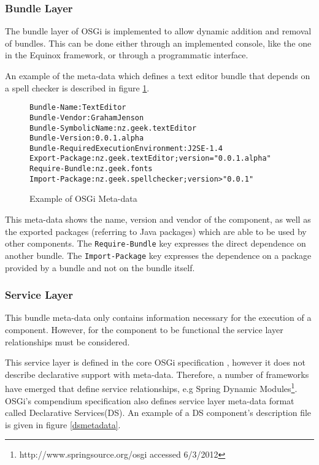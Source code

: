 \subsubsection{Bundle Layer}
The bundle layer of OSGi is implemented to allow dynamic addition and removal of bundles.
This can be done either through an implemented console, like the one in the Equinox framework, or through a programmatic interface.

An example of the meta-data which defines a text editor bundle that depends on a spell checker is described in figure \ref{osgibundle}.

\begin{figure}[htp]
\begin{center}
\begin{alltt}
Bundle-Name: TextEditor
Bundle-Vendor: Graham Jenson
Bundle-SymbolicName: nz.geek.textEditor
Bundle-Version: 0.0.1.alpha
Bundle-RequiredExecutionEnvironment: J2SE-1.4
Export-Package: nz.geek.textEditor;version="0.0.1.alpha"
Require-Bundle: nz.geek.fonts
Import-Package: nz.geek.spellchecker;version>"0.0.1"
\end{alltt}
  \caption[OSGi Meta-data]{Example of OSGi Meta-data}
  \label{osgibundle}
\end{center}
\end{figure}

This meta-data shows the name, version and vendor of the component, as well as the exported packages (referring to Java packages) which are able to be used by other components.
The \texttt{Require-Bundle} key expresses the direct dependence on another bundle.
The \texttt{Import-Package} key expresses the dependence on a package provided by a bundle and not on the bundle itself.

\subsubsection{Service Layer}
This bundle meta-data only contains information necessary for the execution of a component.
However, for the component to be functional the service layer relationships must be considered.

This service layer is defined in the core OSGi specification \citep{osgicore2007}, however it does not describe declarative support with meta-data.
Therefore, a number of frameworks have emerged that define service relationships, e.g
Spring Dynamic Modules\footnote{http://www.springsource.org/osgi accessed 6/3/2012}.
OSGi's compendium specification \citep{osgicompendium2007} also defines service layer meta-data format called Declarative Services(DS).
An example of a DS component's description file is given in figure \ref{dsmetadata}.


